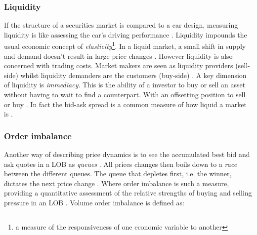 \documentclass{kththesis}
\theoremstyle{definition}
\begin{document}
\subsubsection*{Liquidity}
If the structure of a securities market is compared to a car design, measuring liquidity is like assessing the car's driving performance \parencite{foucault2013market}. Liquidity impounds the usual economic concept of \textit{elasticity}\footnote{a measure of the responsiveness of one economic variable to another}. In a liquid market, a small shift in supply and demand doesn't result in large price changes \parencite{hasbrouck2007empirical}. However liquidity is also concerned with trading costs. Market makers are seen as liquidity providers (sell-side) whilst liquidity demanders are the customers (buy-side) \parencite{hasbrouck2007empirical}. A key dimension of liquidity is \textit{immediacy}. This is the ability of a investor to buy or sell an asset without having to wait to find a counterpart. With an offsetting position to sell or buy \parencite{cartea2015algorithmic}. In fact the bid-ask spread is a common measure of how liquid a market is \parencite{foucault2013market}.

\subsubsection*{Order imbalance}
Another way of describing price dynamics is to see the accumulated best bid and ask quotes in a LOB as \textit{queues} \parencite{bouchaud2018trades}. All prices changes then boils down to a \textit{race} between the different queues. The queue that depletes first, i.e. the winner, dictates the next price change \parencite{bouchaud2018trades}. Where order imbalance is such a measure, providing a quantitative assessment of the relative strengths of buying and selling pressure in an LOB \parencite{bouchaud2018trades}. Volume order imbalance is defined as:
\end{document}

